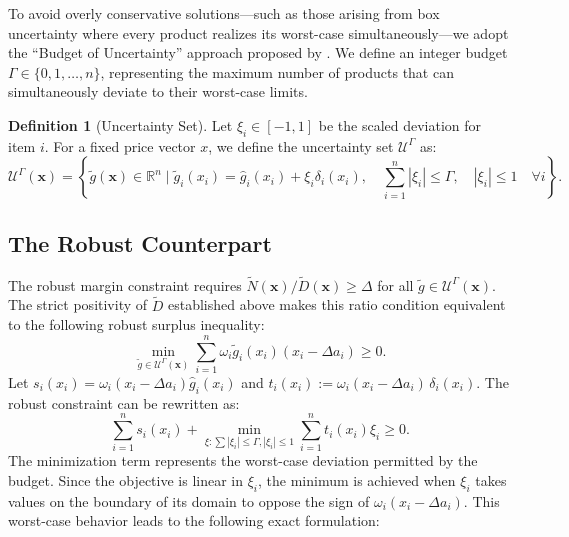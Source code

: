 \documentclass[11pt, a4paper]{article}
\theoremstyle{plain}
\theoremstyle{definition}
\newtheorem{definition}[definition]{Definition}
\theoremstyle{remark}
\begin{document}
To avoid overly conservative solutions—such as those arising from box uncertainty where every product realizes its worst-case simultaneously—we adopt the ``Budget of Uncertainty'' approach proposed by \citet{BertsimasSim2004}. We define an integer budget $\Gamma \in \{0,1,\dots,n\}$, representing the maximum number of products that can simultaneously deviate to their worst-case limits.

\begin{definition}[Uncertainty Set]
Let $\xi_i \in [-1, 1]$ be the scaled deviation for item $i$. For a fixed price vector $x$, we define the uncertainty set $\mathcal{U}^\Gamma$ as:
\begin{equation}
    \mathcal{U}^\Gamma(\bm{x}) = \left\{ \tilde{g}(\bm{x}) \in \mathbb{R}^n \;\bigg|\; \tilde{g}_i(x_i) = \hat{g}_i(x_i) + \xi_i \delta_i(x_i), \quad \sum_{i=1}^n |\xi_i| \le \Gamma, \quad |\xi_i| \le 1 \quad \forall i \right\}.
\end{equation}
\end{definition}

\subsection{The Robust Counterpart}
The robust margin constraint requires $\widetilde N(\bm{x})/\widetilde D(\bm{x})\ge\Delta$ for all $\tilde{g} \in \mathcal{U}^\Gamma(\bm{x})$. The strict positivity of $\widetilde D$ established above makes this ratio condition equivalent to the following robust surplus inequality:
\begin{equation}\label{eq:robust_raw}
    \min_{\tilde{g} \in \mathcal{U}^\Gamma(\bm{x})} \sum_{i=1}^n \omega_i \tilde{g}_i(x_i) (x_i - \Delta a_i) \ge 0.
\end{equation}
Let $s_i(x_i)=\omega_{i} \left( x_{i}-\Delta a_{i} \right) \hat{g}_{i} \left( x_{i} \right)$ and $t_i(x_i):=\omega_i(x_i-\Delta a_i)\,\delta_i(x_i).$ The robust constraint can be rewritten as:
\begin{equation}\label{eq:robust_st}
    \sum_{i=1}^n s_i(x_i) + \min_{\xi : \sum |\xi_i| \le \Gamma, |\xi_i| \le 1} \sum_{i=1}^n t_i(x_i) \xi_i \ge 0.
\end{equation}
The minimization term represents the worst-case deviation permitted by the budget. Since the objective is linear in $\xi_i$, the minimum is achieved when $\xi_i$ takes values on the boundary of its domain to oppose the sign of $\omega_i(x_i-\Delta a_i)$. This worst-case behavior leads to the following exact formulation:
\end{document}

